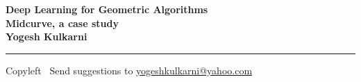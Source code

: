 
\graphicspath{{images/}}

\footnotesize


\begin{center}
\Large{\textbf{Deep Learning for Geometric Algorithms\\ Midcurve, a case study \\ Yogesh Kulkarni}}  
\end{center}

\begin{multicols}{2}

\end{multicols}

\rule{\linewidth}{0.25pt}
\scriptsize
Copyleft \textcopyleft\  Send suggestions to 
\href{http://www.yogeshkulkarni.com}{yogeshkulkarni@yahoo.com}


